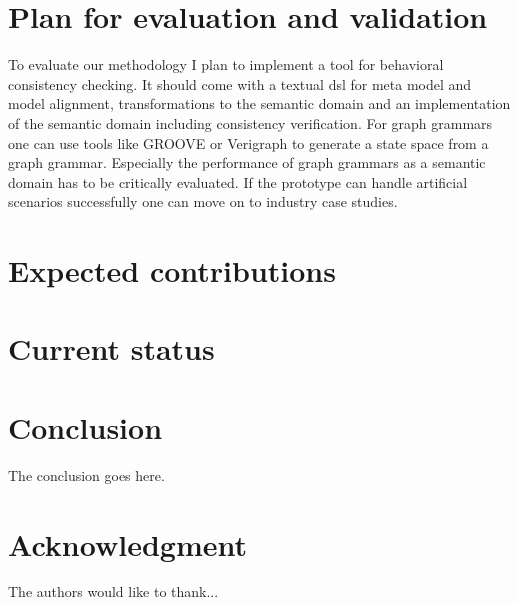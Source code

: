 \documentclass[conference]{IEEEtran}
\begin{document}
\section{Plan for evaluation and validation}
To evaluate our methodology I plan to implement a tool for behavioral consistency checking.
It should come with a textual \gls{dsl} for meta model and model alignment, transformations to the semantic domain and an implementation of the semantic domain including consistency verification.
For graph grammars one can use tools like GROOVE \cite{ghamarianModellingAnalysisUsing2012, rensinkGROOVESimulatorTool2004} or Verigraph \cite{costaVerigraphSystemSpecification2016} to generate a state space from a graph grammar.
Especially the performance of graph grammars as a semantic domain has to be critically evaluated.
If the prototype can handle artificial scenarios successfully one can move on to industry case studies.

\section{Expected contributions}
\section{Current status} \label{sec:currentStatus}



\section{Conclusion}
The conclusion goes here.

\section*{Acknowledgment}
The authors would like to thank...



\end{document}
